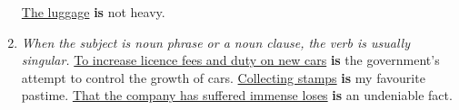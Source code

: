 \begin{enumerate}
        \newline
        \underline{The luggage} \textbf{is} not heavy.
    \item
        {\it
        When the subject is noun phrase or a noun clause, the verb is usually
        singular.
        }
        \newline
        \newline
        \underline{To increase licence fees and duty on new cars} \textbf{is}
        the government's attempt to control the growth of cars.
        \newline
        \newline
        \underline{Collecting stamps} \textbf{is} my favourite pastime.
        \newline
        \newline
        \underline{That the company has suffered immense loses} \textbf{is} an
        undeniable fact.
\end{enumerate}

